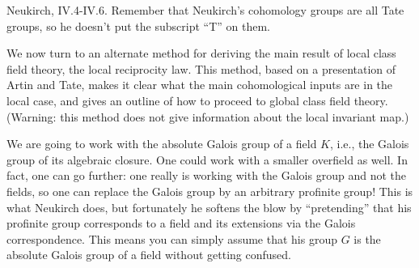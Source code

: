 %
%
%
%
%
%
%

 Neukirch, IV.4-IV.6. Remember that Neukirch's cohomology
groups are all Tate groups, so he doesn't put the subscript ``T'' on them.

\medskip
We now turn to an alternate method for deriving the main result of local
class field theory, the local reciprocity law. This method, based on a
presentation of Artin and Tate, makes it clear what the main cohomological
inputs are in the local case, and gives an outline of how to proceed to
global class field theory. (Warning: this method does not give information
about the local invariant map.)

 We are going to work with the absolute Galois group of a
field $K$, i.e., the Galois group of its algebraic closure. One could work
with a smaller overfield as well. In fact, one can go further: one really
is working with the Galois group and not the fields, so one can replace the
Galois group by an arbitrary profinite group! This is what Neukirch does, but
fortunately he softens the blow by ``pretending'' that his profinite group
corresponds to a field and its extensions via the Galois correspondence.
This means you can simply assume that his group $G$ is the absolute Galois
group of a field without getting confused.

